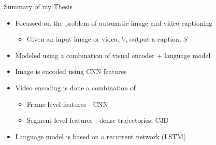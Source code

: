 \documentclass{beamer}
\begin{document}
\begin{frame}{Summary of my Thesis}
\begin{itemize}
\item Focussed on the problem of automatic image and video captioning 
    \begin{itemize}
         \item Given an input image or video, $V$, output a caption, $S$
    \end{itemize}
\item Modeled using a combination of visual encoder + language model 
\item Image is encoded using CNN features
\item Video encoding is done a combination of
    \begin{itemize}
        \item Frame level features - CNN
        \item Segment level features - dense trajectories, C3D 
    \end{itemize}
\item Language model is based on a recurrent network (LSTM) 
\end{itemize}
\end{frame}
\end{document}
